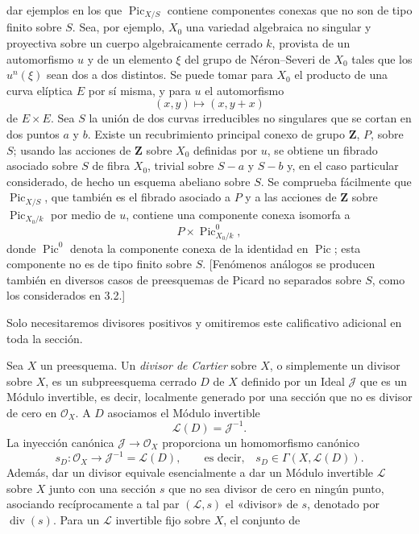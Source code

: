 dar ejemplos en los que $\operatorname{Pic}_{X/S}$ contiene componentes conexas
que no son de tipo finito sobre $S$. Sea, por ejemplo, $X_0$ una variedad
algebraica no singular y proyectiva sobre un cuerpo algebraicamente cerrado
$k$, provista de un automorfismo $u$ y de un elemento $\xi$ del grupo de
Néron--Severi de $X_0$ tales que los $u^n(\xi)$ sean dos a dos distintos. Se
puede tomar para $X_0$ el producto de una curva elíptica $E$ por sí misma, y
para $u$ el automorfismo
\[
(x,y)\longmapsto(x,y+x)
\]
de $E\times E$. Sea $S$ la unión de dos curvas irreducibles no singulares que
se cortan en dos puntos $a$ y $b$. Existe un recubrimiento principal conexo de
grupo $\mathbf Z$, $P$, sobre $S$; usando las acciones de $\mathbf Z$ sobre $X_0$
definidas por $u$, se obtiene un fibrado asociado sobre $S$ de fibra $X_0$,
trivial sobre $S-a$ y $S-b$ y, en el caso particular considerado, de hecho un
esquema abeliano sobre $S$. Se comprueba fácilmente que
$\operatorname{Pic}_{X/S}$, que también es el fibrado asociado a $P$ y a las
acciones de $\mathbf Z$ sobre $\operatorname{Pic}_{X_0/k}$ por medio de $u$,
contiene una componente conexa isomorfa a
\[
P\times\operatorname{Pic}^{0}_{X_0/k},
\]
donde $\operatorname{Pic}^{0}$ denota la componente conexa de la identidad en
$\operatorname{Pic}$; esta componente no es de tipo finito sobre $S$.
[Fenómenos análogos se producen también en diversos casos de preesquemas de
Picard no separados sobre $S$, como los considerados en 3.2.]


Solo necesitaremos divisores positivos y omitiremos este calificativo adicional
en toda la sección.

Sea $X$ un preesquema. Un \emph{divisor de Cartier} sobre $X$, o simplemente un
divisor sobre $X$, es un subpreesquema cerrado $D$ de $X$ definido por un Ideal
$\mathcal J$ que es un Módulo invertible, es decir, localmente generado por una
sección que no es divisor de cero en $\mathcal O_X$. A $D$ asociamos el Módulo
invertible
\[
\mathcal L(D)=\mathcal J^{-1}.
\]
La inyección canónica $\mathcal J\longrightarrow\mathcal O_X$ proporciona un
homomorfismo canónico
\[
s_D:\mathcal O_X\longrightarrow\mathcal J^{-1}=\mathcal L(D),
\qquad\text{es decir,}\quad s_D\in\Gamma(X,\mathcal L(D)).
\]
Además, dar un divisor equivale esencialmente a dar un Módulo invertible
$\mathcal L$ sobre $X$ junto con una sección $s$ que no sea divisor de cero en
ningún punto, asociando recíprocamente a tal par $(\mathcal L,s)$ el
«divisor» de $s$, denotado por $\operatorname{div}(s)$. Para un $\mathcal L$
invertible fijo sobre $X$, el conjunto de

